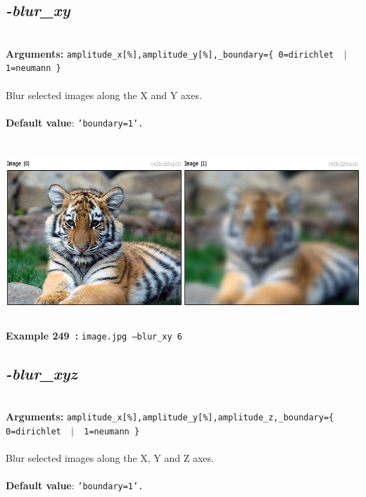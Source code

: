 \documentclass[a4paper,11pt,twoside]{book}
\begin{document}
\subsection{\emph{-blur\_xy} }\vspace*{-0.5em}
~\\\textbf{Arguments: } 
{\small \texttt{amplitude\_x[\%],amplitude\_y[\%],\_boundary=\{ 0=dirichlet ~$|$~ 1=neumann \}}}\\~\\
Blur selected images along the X and Y axes.
~\\~\\\textbf{Default value}: {\small \texttt{'boundary=1'.}}
\begin{center}\includegraphics[keepaspectratio=true,height=7cm,width=\textwidth]{img/gmic_def249.jpg}\\
{\footnotesize \textbf{Example 249~:} \texttt{image.jpg --blur\_xy 6}}
\end{center}

\subsection{\emph{-blur\_xyz} }\vspace*{-0.5em}
~\\\textbf{Arguments: } 
{\small \texttt{amplitude\_x[\%],amplitude\_y[\%],amplitude\_z,\_boundary=\{ 0=dirichlet ~$|$~ 1=neumann \}}}\\~\\
Blur selected images along the X, Y and Z axes.
~\\~\\\textbf{Default value}: {\small \texttt{'boundary=1'.}}
\end{document}
